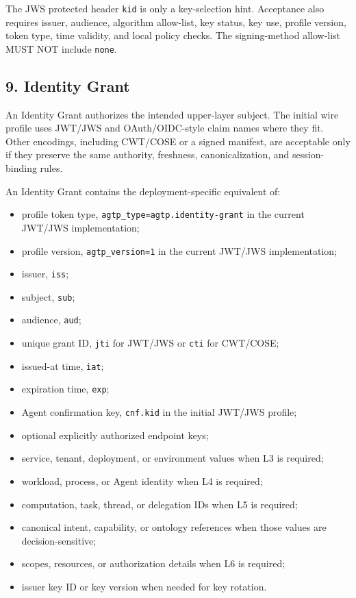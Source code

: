 \documentclass[
]{article}
\providecommand{\tightlist}{%
  \setlength{\itemsep}{0pt}\setlength{\parskip}{0pt}}
\begin{document}
The JWS protected header \texttt{kid} is only a key-selection hint.
Acceptance also requires issuer, audience, algorithm allow-list, key
status, key use, profile version, token type, time validity, and local
policy checks. The signing-method allow-list MUST NOT include
\texttt{none}.

\subsection{9. Identity Grant}\label{identity-grant}

An Identity Grant authorizes the intended upper-layer subject. The
initial wire profile uses JWT/JWS and OAuth/OIDC-style claim names where
they fit. Other encodings, including CWT/COSE or a signed manifest, are
acceptable only if they preserve the same authority, freshness,
canonicalization, and session-binding rules.

An Identity Grant contains the deployment-specific equivalent of:

\begin{itemize}
\tightlist
\item
  profile token type, \texttt{agtp\_type=agtp.identity-grant} in the
  current JWT/JWS implementation;
\item
  profile version, \texttt{agtp\_version=1} in the current JWT/JWS
  implementation;
\item
  issuer, \texttt{iss};
\item
  subject, \texttt{sub};
\item
  audience, \texttt{aud};
\item
  unique grant ID, \texttt{jti} for JWT/JWS or \texttt{cti} for
  CWT/COSE;
\item
  issued-at time, \texttt{iat};
\item
  expiration time, \texttt{exp};
\item
  Agent confirmation key, \texttt{cnf.kid} in the initial JWT/JWS
  profile;
\item
  optional explicitly authorized endpoint keys;
\item
  service, tenant, deployment, or environment values when L3 is
  required;
\item
  workload, process, or Agent identity when L4 is required;
\item
  computation, task, thread, or delegation IDs when L5 is required;
\item
  canonical intent, capability, or ontology references when those values
  are decision-sensitive;
\item
  scopes, resources, or authorization details when L6 is required;
\item
  issuer key ID or key version when needed for key rotation.
\end{itemize}
\end{document}
